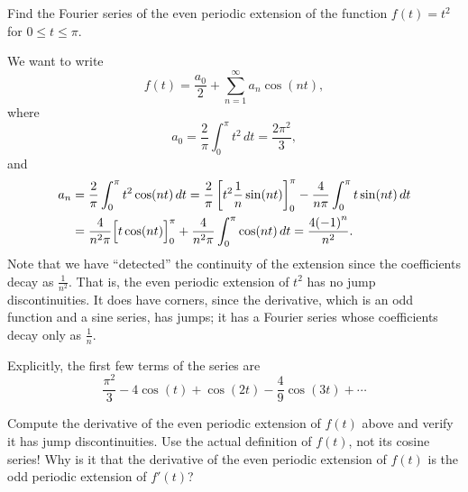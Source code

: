 \documentclass{ximera}
\begin{document}

\begin{example}
    Find the Fourier series of the even periodic extension of the function $f(t) = t^2$ for $0 \leq t \leq \pi$.
\end{example}

\begin{exampleSol}
    We want to write
    \begin{equation*}
        f(t) = \frac{a_0}{2} + \sum_{n=1}^\infty a_n \cos (n t) ,
    \end{equation*}
    where
    \begin{equation*}
        a_0 = \frac{2}{\pi} \int_0^\pi t^2 \, dt = \frac{2 \pi^2}{3} ,
    \end{equation*}
    and
    \begin{equation*}
        \begin{split}
            a_n & = \frac{2}{\pi} \int_0^\pi t^2 \cos (n t) \, dt
            = \frac{2}{\pi} \left[ t^2 \frac{1}{n} \sin (nt) \right]_0^\pi - \frac{4}{n\pi} \int_0^\pi t \sin (n t) \, dt \\
            & = \frac{4}{n^2\pi} \Bigl[ t \cos (n t) \Bigr]_0^\pi + \frac{4}{n^2\pi} \int_0^\pi \cos (n t) \, dt
            = \frac{4{(-1)}^n}{n^2} .
        \end{split}
    \end{equation*}
    Note that we have ``detected'' the continuity of the extension since the coefficients decay as $\frac{1}{n^2}$.  That is, the even periodic extension of $t^2$ has no jump discontinuities.  It does have corners, since the derivative, which is an odd function and a sine series, has jumps; it has a Fourier series whose coefficients decay only as $\frac{1}{n}$.
    
    Explicitly, the first few terms of the series are
    \begin{equation*}
        \frac{\pi^2}{3} - 4 \cos (t) + \cos (2t) - \frac{4}{9} \cos (3t) + \cdots
    \end{equation*}
\end{exampleSol}

\begin{exercise}
    \begin{tasks}
        \task Compute the derivative of the even periodic extension of $f(t)$ above and verify it has jump discontinuities.  Use the actual definition of $f(t)$, not its cosine series!
        \task Why is it that the derivative of the even periodic extension of $f(t)$ is the odd periodic extension of $f'(t)$?
    \end{tasks}
\end{exercise}
\end{document}
